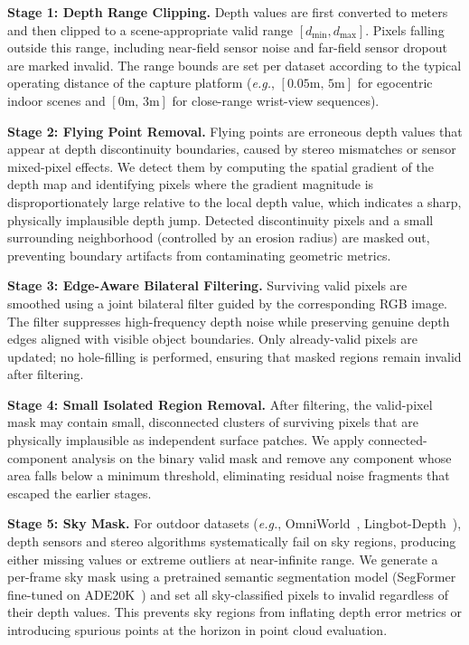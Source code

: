 \textbf{Stage 1: Depth Range Clipping.}
Depth values are first converted to meters and then clipped to a scene-appropriate valid range $[d_{\min}, d_{\max}]$. 
%
Pixels falling outside this range, including near-field sensor noise and far-field sensor dropout are marked invalid.
%
The range bounds are set per dataset according to the typical operating distance of the capture platform (\emph{e.g.}, $[0.05\text{m},\,5\text{m}]$ for egocentric indoor scenes and $[0\text{m},\,3\text{m}]$ for close-range wrist-view sequences).

\textbf{Stage 2: Flying Point Removal.}
Flying points are erroneous depth values that appear at depth discontinuity boundaries, caused by stereo mismatches or sensor mixed-pixel effects.
%
We detect them by computing the spatial gradient of the depth map and identifying pixels where the gradient magnitude is disproportionately large relative to the local depth value, which indicates a sharp, physically implausible depth jump.
%
Detected discontinuity pixels and a small surrounding neighborhood (controlled by an erosion radius) are masked out, preventing boundary artifacts from contaminating geometric metrics.

\textbf{Stage 3: Edge-Aware Bilateral Filtering.}
Surviving valid pixels are smoothed using a joint bilateral filter guided by the corresponding RGB image.
%
The filter suppresses high-frequency depth noise while preserving genuine depth edges aligned with visible object boundaries.
%
Only already-valid pixels are updated; no hole-filling is performed, ensuring that masked regions remain invalid after filtering.

\textbf{Stage 4: Small Isolated Region Removal.}
After filtering, the valid-pixel mask may contain small, disconnected clusters of surviving pixels that are physically implausible as independent surface patches.
%
We apply connected-component analysis on the binary valid mask and remove any component whose area falls below a minimum threshold, eliminating residual noise fragments that escaped the earlier stages.

\textbf{Stage 5: Sky Mask.}
For outdoor datasets (\emph{e.g.}, OmniWorld~\citep{zhou2025omniworld}, Lingbot-Depth~\citep{lingbot-depth2026}), depth sensors and stereo algorithms systematically fail on sky regions, producing either missing values or extreme outliers at near-infinite range. 
%
We generate a per-frame sky mask using a pretrained semantic segmentation model (SegFormer~\citep{xie2021segformer} fine-tuned on ADE20K~\citep{zhou2019ade20k}) and set all sky-classified pixels to invalid regardless of their depth values.
%
This prevents sky regions from inflating depth error metrics or introducing spurious points at the horizon in point cloud evaluation.
